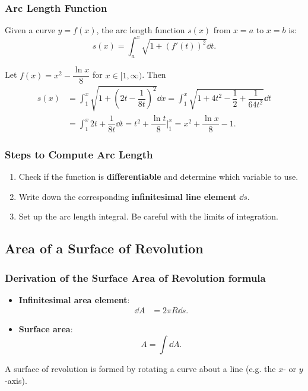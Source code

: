 \subsubsection{Arc Length Function}
Given a curve $y = f(x)$, the arc length function $s(x)$ from $x = a$ to $x = b$ is:
\begin{equation*}
    s(x) = \int_a^x \sqrt{1 + \left(f'(t)\right)^2} \dd t.
\end{equation*}


\begin{ex} Let $f(x) = x^2 - \dfrac{\ln x}{8}$ for $x \in [1,\infty)$. Then
    \begin{align*}
    s(x) &= \int_1^x \sqrt{1 + \left(2t -\dfrac{1}{8t}\right)^2} \dd x = \int_1^x \sqrt{1 + 4t^2 - \dfrac{1}{2} + \dfrac{1}{64t^2} } \dd t\\
    &= \int_1^x 2t + \dfrac{1}{8t} \dd t = t^2 + \dfrac{\ln t}{8} \Big|_1^x = x^2 + \dfrac{\ln x}{8} - 1.
    \end{align*}
\end{ex}

\subsubsection{Steps to Compute Arc Length}
\begin{enumerate}
    \item Check if the function is \textbf{differentiable} and determine which variable to use.
    \item Write down the corresponding \textbf{infinitesimal line element} $\dd s$.
    \item Set up the arc length integral. Be careful with the limits of integration.
\end{enumerate}


\subsection{Area of a Surface of Revolution} 
\subsubsection{Derivation of the Surface Area of Revolution formula}
\begin{center}
\begin{tcolorbox}
    \begin{itemize}
        \item \textbf{Infinitesimal area element}:
        \begin{align*}
            \dd A &= 2\pi R \dd s. 
        \end{align*}
        \item \textbf{Surface area}:
            \[A = \int \dd A.\]
    \end{itemize}
\end{tcolorbox}
\end{center}
A surface of revolution is formed by rotating a curve about a line (e.g. the $x$- or $y$-axis). 


